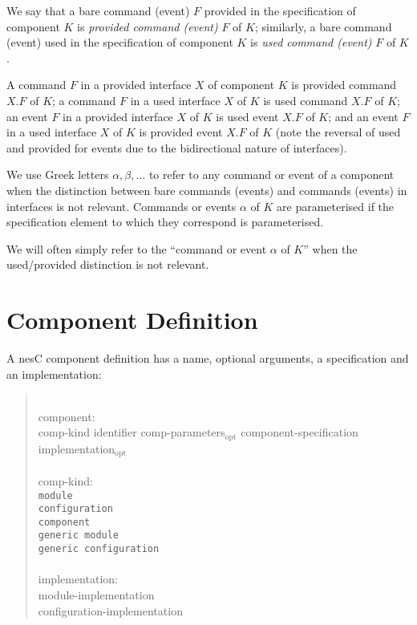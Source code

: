 \documentclass[11pt,letterpaper]{article}
\newcommand{\kw}[1]{{\tt #1}}
\newcommand{\nesc}{nesC\xspace}
\newcommand{\opt}{$_{\mbox{opt}}$\xspace}
\newcommand{\grammarshift}{\vspace*{-.7cm}}
\newcommand{\grammarindent}{\hspace*{2cm}\= \\ \kill}
\begin{document}
We say that a bare command (event) $F$ provided in the specification of
component $K$ is \emph{provided command (event)} $F$ of $K$; similarly, a
bare command (event) used in the specification of component $K$ is
\emph{used command (event)} $F$ of $K$.

A command $F$ in a provided interface $X$ of component $K$ is
provided command $X.F$ of $K$; a command $F$ in a used interface
$X$ of $K$ is used command $X.F$ of $K$; an event $F$ in a provided
interface $X$ of $K$ is used event $X.F$ of $K$; and an event $F$
in a used interface $X$ of $K$ is provided event $X.F$ of $K$
(note the reversal of used and provided for events due to the bidirectional
nature of interfaces). 

We use Greek letters $\alpha, \beta, \ldots$ to refer to any command or
event of a component when the distinction between bare commands (events)
and commands (events) in interfaces is not relevant. Commands or events
$\alpha$ of $K$ are parameterised if the specification element to which they
correspond is parameterised.

We will often simply refer to the ``command or event $\alpha$ of $K$'' when
the used/provided distinction is not relevant.

\section{Component Definition}
\label{sec:component}

A \nesc component definition has a name, optional arguments, a
specification and an implementation:
\begin{quote} \grammarshift \em \begin{tabbing}
\grammarindent
component:\\
\>	comp-kind identifier comp-parameters\opt component-specification implementation\opt\\
\\
comp-kind:\\
\>	\kw{module}\\
\>	\kw{configuration}\\
\>	\kw{component}\\
\>	\kw{generic module}\\
\>	\kw{generic configuration}\\
\\
implementation:\\
\>	module-implementation\\
\>	configuration-implementation
\end{tabbing} \end{quote}
\end{document}
